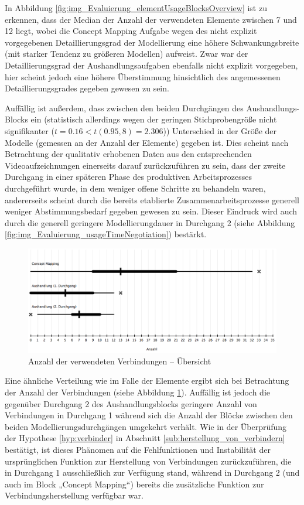 In Abbildung \ref{fig:img_Evaluierung_elementUsageBlocksOverview} ist zu erkennen, dass der Median der Anzahl der verwendeten Elemente zwischen 7 und 12 liegt, wobei die Concept Mapping Aufgabe wegen des nicht explizit vorgegebenen Detaillierungsgrad der Modellierung eine höhere Schwankungsbreite (mit starker Tendenz zu größeren Modellen) aufweist. Zwar war der Detaillierungsgrad der Aushandlungsaufgaben ebenfalls nicht explizit vorgegeben, hier scheint jedoch eine höhere Überstimmung hinsichtlich des angemessenen Detaillierungsgrades gegeben gewesen zu sein. 

Auffällig ist außerdem, dass zwischen den beiden Durchgängen des Aushandlungs-Blocks ein (statistisch allerdings wegen der geringen Stichprobengröße nicht signifikanter ($t=0.16 < t(0.95,8)=2.306$)) Unterschied in der Größe der Modelle (gemessen an der Anzahl der Elemente) gegeben ist. Dies scheint nach Betrachtung der qualitativ erhobenen Daten aus den entsprechenden Videoaufzeichnungen einerseits darauf zurückzuführen zu sein, dass der zweite Durchgang in einer späteren Phase des produktiven Arbeitsprozesses durchgeführt wurde, in dem weniger offene Schritte zu behandeln waren, andererseits scheint durch die bereits etablierte Zusammenarbeitsprozesse generell weniger Abstimmungsbedarf gegeben gewesen zu sein. Dieser Eindruck wird auch durch die generell geringere Modellierungdauer in Durchgang 2 (siehe Abbildung \ref{fig:img_Evaluierung_usageTimeNegotiation}) bestärkt.

\begin{figure}[htbp]
	\centering
		\includegraphics[width=15cm]{img/Evaluierung/elementUsageConnectorsOverview.png}
	\caption{Anzahl der verwendeten Verbindungen -- Übersicht}
	\label{fig:img_Evaluierung_elementUsageConnectorsOverview}
\end{figure}

Eine ähnliche Verteilung wie im Falle der Elemente ergibt sich bei Betrachtung der Anzahl der Verbindungen (siehe Abbildung \ref{fig:img_Evaluierung_elementUsageConnectorsOverview}). Auffällig ist jedoch die gegenüber Durchgang 2 des Aushandlungsblocks geringere Anzahl von Verbindungen in Durchgang 1 während sich die Anzahl der Blöcke zwischen den beiden Modellierungsdurchgängen umgekehrt verhält. Wie in der Überprüfung der Hypothese \ref{hyp:verbinder} in Abschnitt \ref{sub:herstellung_von_verbindern} bestätigt, ist dieses Phänomen auf die Fehlfunktionen und Instabilität der ursprünglichen Funktion zur Herstellung von Verbindungen zurückzuführen, die in Durchgang 1 ausschließlich zur Verfügung stand, während in Durchgang 2 (und auch im Block „Concept Mapping“) bereits die zusätzliche Funktion zur Verbindungsherstellung verfügbar war.

